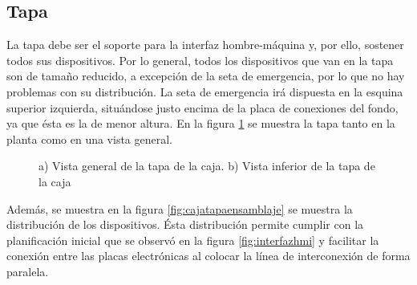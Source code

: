 \subsection{Tapa}

La tapa debe ser el soporte para la interfaz hombre-máquina y, por ello, sostener todos sus 
dispositivos. Por lo general, todos los dispositivos que van en la tapa son de tamaño reducido,
a excepción de la seta de emergencia, por lo que no hay problemas con su distribución. La seta
de emergencia irá dispuesta en la esquina superior izquierda, situándose justo encima de la placa
de conexiones del fondo, ya que ésta es la de menor altura. En la figura \ref{fig:cajatapa} se 
muestra la tapa tanto en la planta como en una vista general.

\begin{figure}[h]%
    \centering 
    \hspace{10pt}%
    \caption{a) Vista general de la tapa de la caja. b) Vista inferior de la tapa de la caja}
    \label{fig:cajatapa} 
\end{figure} 

Además, se muestra en la figura \ref{fig:cajatapaensamblaje} se muestra la distribución de los 
dispositivos. Ésta distribución permite cumplir con la planificación inicial que se observó en 
la figura \ref{fig:interfazhmi} y facilitar la conexión entre las placas electrónicas al colocar
la línea de interconexión de forma paralela.

